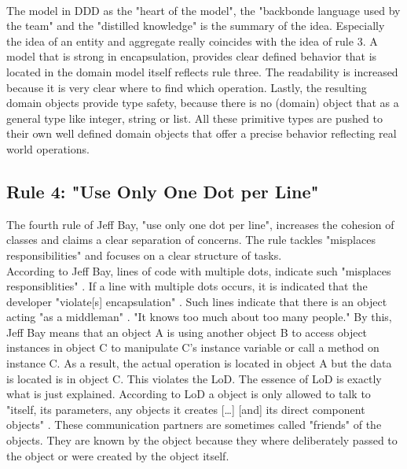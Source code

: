 \\
The model in \ac{DDD} as the "heart of the model", the "backbonde language used by the team" and the "distilled knowledge" \cite[p. 25]{dddbook} is the summary of the idea. Especially the idea of an entity and aggregate really coincides with the idea of rule 3. A model that is strong in encapsulation, provides clear defined behavior that is located in the domain model itself reflects rule three. The readability is increased because it is very clear where to find which operation. Lastly, the resulting domain objects provide type safety, because there is no (domain) object that as a general type like integer, string or list. All these primitive types are pushed to their own well defined domain objects that offer a precise behavior reflecting real world operations. 



\subsection*{Rule 4: "Use Only One Dot per Line"}
The fourth rule of Jeff Bay, "use only one dot per line", increases the cohesion of classes and claims a clear separation of concerns. The rule tackles "misplaces responsibilities" \cite{oc2008} and focuses on a clear structure of tasks.\\

According to Jeff Bay, lines of code with multiple dots, indicate such "misplaces responsiblities" \cite{oc2008}. If a line with multiple dots occurs, it is indicated that the developer "violate[s] encapsulation" \cite{oc2008}. Such lines indicate that there is an object acting "as a middleman" \cite{oc2008}. "It knows too much about too many people." \cite{oc2008} By this, Jeff Bay means that an object A is using another object B to access object instances in object C to manipulate C's instance variable or call a method on instance C. As a result, the actual operation is located in object A but the data is located is in object C. This violates the \ac{LoD}. The essence of \ac{LoD} is exactly what is just explained. According to \ac{LoD} a object is only allowed to talk to "itself, its parameters, any objects it creates [\dots] [and] its direct component objects" \cite{ba.com}. These communication partners are sometimes called "friends" of the objects. They are known by the object because they where deliberately passed to the object or were created by the object itself.  
\\

